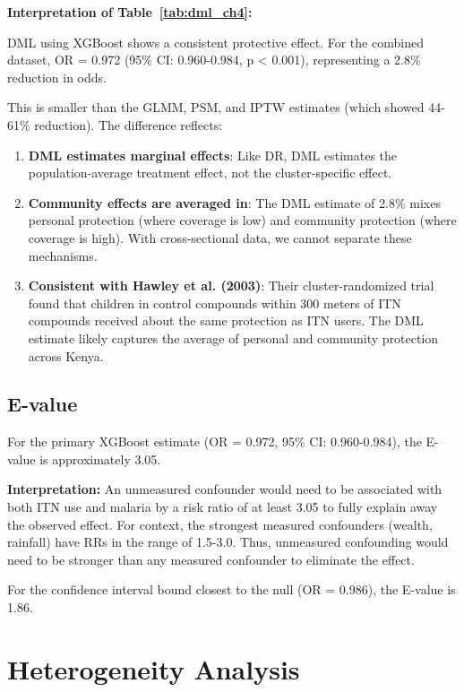 \textbf{Interpretation of Table~\ref{tab:dml_ch4}:}

DML using XGBoost shows a consistent protective effect. For the combined dataset, OR = 0.972 (95\% CI: 0.960-0.984, p < 0.001), representing a 2.8\% reduction in odds.

This is smaller than the GLMM, PSM, and IPTW estimates (which showed 44-61\% reduction). The difference reflects:

\begin{enumerate}
	\item \textbf{DML estimates marginal effects}: Like DR, DML estimates the population-average treatment effect, not the cluster-specific effect.
	
	\item \textbf{Community effects are averaged in}: The DML estimate of 2.8\% mixes personal protection (where coverage is low) and community protection (where coverage is high). With cross-sectional data, we cannot separate these mechanisms.
	
	\item \textbf{Consistent with Hawley et al. (2003)}: Their cluster-randomized trial found that children in control compounds within 300 meters of ITN compounds received about the same protection as ITN users. The DML estimate likely captures the average of personal and community protection across Kenya.
\end{enumerate}

\subsection{E-value}

For the primary XGBoost estimate (OR = 0.972, 95\% CI: 0.960-0.984), the E-value is approximately 3.05.

\textbf{Interpretation:} An unmeasured confounder would need to be associated with both ITN use and malaria by a risk ratio of at least 3.05 to fully explain away the observed effect. For context, the strongest measured confounders (wealth, rainfall) have RRs in the range of 1.5-3.0. Thus, unmeasured confounding would need to be stronger than any measured confounder to eliminate the effect.

For the confidence interval bound closest to the null (OR = 0.986), the E-value is 1.86.

\section{Heterogeneity Analysis}


